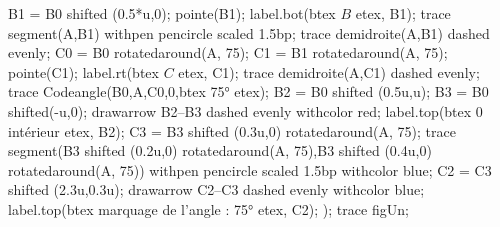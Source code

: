 \begin{changemargin}{0mm}{-20mm}
\begin{methode}
\begin{Geometrie}[CoinHD={(8.5u,5u)}]
                B1 = B0 shifted (0.5*u,0);
                pointe(B1);
                label.bot(btex $B$ etex, B1);
                trace segment(A,B1) withpen pencircle scaled 1.5bp;
                trace demidroite(A,B1) dashed evenly;
                C0 = B0 rotatedaround(A, 75);
                C1 = B1 rotatedaround(A, 75);
                pointe(C1);
                label.rt(btex $C$ etex, C1);
                trace demidroite(A,C1) dashed evenly;
                trace Codeangle(B0,A,C0,0,btex \ang{75} etex);
                B2 = B0 shifted (0.5u,u);
                B3 = B0 shifted(-u,0);
                drawarrow B2--B3 dashed evenly withcolor red;
                label.top(btex {\red $0$ intérieur} etex, B2);
                C3 = B3 shifted (0.3u,0) rotatedaround(A, 75);
                trace segment(B3 shifted (0.2u,0) rotatedaround(A, 75),B3 shifted (0.4u,0) rotatedaround(A, 75)) withpen pencircle scaled 1.5bp withcolor blue;
                C2 = C3 shifted (2.3u,0.3u);
                drawarrow C2--C3 dashed evenly withcolor blue;
                label.top(btex {\blue marquage de l'angle : \ang{75}} etex, C2);
            );
            trace figUn;
        \end{Geometrie}        
    \end{methode}
\end{changemargin}
\vspace*{-20mm}
